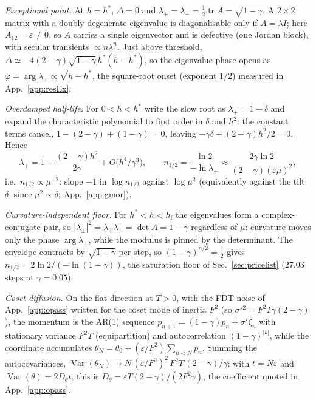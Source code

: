 \documentclass[mlabstract,onecolumn]{jmlr}
\begin{document}
\emph{Exceptional point.} At $h=h^*$, $\Delta=0$ and $\lambda_+=\lambda_-=\tfrac12\operatorname{tr}A=\sqrt{1-\gamma}$. A $2\times2$ matrix with a doubly degenerate eigenvalue is diagonalisable only if $A=\lambda I$; here $A_{12}=\varepsilon\neq0$, so $A$ carries a single eigenvector and is defective (one Jordan block), with secular transients $\propto n\lambda^n$. Just above threshold, $\Delta\simeq-4(2-\gamma)\sqrt{1-\gamma}\,h^*(h-h^*)$, so the eigenvalue phase opens as $\varphi=\arg\lambda_+\propto\sqrt{h-h^*}$, the square-root onset (exponent $1/2$) measured in App.~\ref{app:resEx}.

\emph{Overdamped half-life.} For $0<h<h^*$ write the slow root as $\lambda_+=1-\delta$ and expand the characteristic polynomial to first order in $\delta$ and $h^2$: the constant terms cancel, $1-(2-\gamma)+(1-\gamma)=0$, leaving $-\gamma\delta+(2-\gamma)h^2/2=0$. Hence
\begin{equation}\label{eq:overdamped}
\lambda_+=1-\frac{(2-\gamma)h^2}{2\gamma}+O\!\bigl(h^4/\gamma^3\bigr),
\qquad
n_{1/2}=\frac{\ln2}{-\ln\lambda_+}\approx\frac{2\gamma\ln2}{(2-\gamma)(\varepsilon\mu)^2},
\end{equation}
i.e.\ $n_{1/2}\propto\mu^{-2}$: slope $-1$ in $\log n_{1/2}$ against $\log\mu^2$ (equivalently against the tilt $\delta$, since $\mu^2\propto\delta$; App.~\ref{app:gmor}).

\emph{Curvature-independent floor.} For $h^*<h<h_{\mathrm f}$ the eigenvalues form a complex-conjugate pair, so $|\lambda_\pm|^2=\lambda_+\lambda_-=\det A=1-\gamma$ regardless of $\mu$: curvature moves only the phase $\arg\lambda_\pm$, while the modulus is pinned by the determinant. The envelope contracts by $\sqrt{1-\gamma}$ per step, so $(1-\gamma)^{n/2}=\tfrac12$ gives $n_{1/2}=2\ln2/(-\ln(1-\gamma))$, the saturation floor of Sec.~\ref{sec:pricelist} ($27.03$ steps at $\gamma=0.05$).

\emph{Coset diffusion.} On the flat direction at $T>0$, with the FDT noise of App.~\ref{app:opass} written for the coset mode of inertia $F^2$ (so $\sigma^{\star2}=F^2T\gamma(2-\gamma)$), the momentum is the AR(1) sequence $p_{n+1}=(1-\gamma)p_n+\sigma^\star\xi_n$ with stationary variance $F^2T$ (equipartition) and autocorrelation $(1-\gamma)^{|k|}$, while the coordinate accumulates $\theta_N=\theta_0+(\varepsilon/F^2)\sum_{n<N}p_n$. Summing the autocovariances, $\operatorname{Var}(\theta_N)\to N\,(\varepsilon/F^2)^2\,F^2T\,(2-\gamma)/\gamma$; with $t=N\varepsilon$ and $\operatorname{Var}(\theta)=2D_\theta t$, this is $D_\theta=\varepsilon T(2-\gamma)/(2F^2\gamma)$, the coefficient quoted in App.~\ref{app:opass}.
\end{document}

